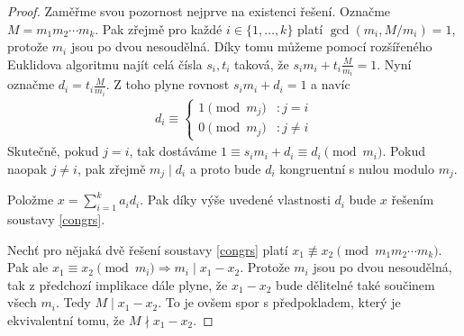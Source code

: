 \begin{proof}
Zaměřme svou pozornost nejprve na existenci řešení. Označme
$ M = m_1 m_2 \cdots m_k $. Pak zřejmě pro každé $ i \in \{1,\dots,k\} $
platí $ \gcd(m_i, M / m_i) = 1 $, protože $ m_i $ jsou po dvou nesoudělná.
Díky tomu můžeme pomocí rozšířeného Euklidova algoritmu najít celá čísla
$ s_i, t_i $ taková, že $ s_i m_i + t_i \frac{M}{m_i} = 1 $. Nyní označme
$ d_i = t_i \frac{M}{m_i} $. Z toho plyne rovnost $ s_i m_i + d_i = 1 $ a navíc
\begin{align*}
d_i \equiv
\left\{
  \begin{array}{lr}
    1 \pmod{ m_j } & : j = i \\
    0 \pmod{ m_j }  & : j \neq i
  \end{array}
\right.
\end{align*}
Skutečně, pokud $ j = i $, tak dostáváme
$ 1 \equiv s_i m_i + d_i \equiv d_i \pmod{m_i} $. Pokud naopak $ j \neq i $, pak
zřejmě $ m_j \mid d_i $ a proto bude $ d_i $ kongruentní s nulou modulo $ m_j $.

Položme $ x = \sum\limits_{i = 1}^{k} a_i d_i $. Pak díky výše uvedené
vlastnosti $ d_i $ bude $ x $ řešením soustavy \eqref{congrs}.

Nechť pro nějaká dvě řešení soustavy \eqref{congrs} platí
$ x_1 \not\equiv x_2 \pmod{m_1 m_2 \cdots m_k} $. Pak ale
$ x_1 \equiv x_2 \pmod{m_i} \Rightarrow m_i \mid x_1 - x_2 $. Protože $ m_i $
jsou po dvou nesoudělná, tak z předchozí implikace dále plyne, že
$ x_1 - x_2 $ bude dělitelné také součinem všech $ m_i $. Tedy
$ M \mid x_1 - x_2 $. To je ovšem spor s předpokladem, který je ekvivalentní
tomu, že $ M \nmid x_1 - x_2 $.
\end{proof}

